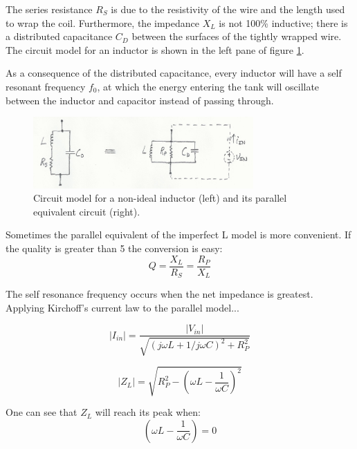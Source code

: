 \documentclass[titlepage, letterpaper, 11pt]{article}
\begin{document}
The series resistance $R_{S}$ is due to the resistivity of the
wire and the length used to wrap the coil. Furthermore, the
impedance $X_{L}$ is not 100\% inductive; there is a distributed
capacitance $C_{D}$ between the surfaces of the tightly wrapped
wire. The circuit model for an inductor is shown in the left pane of
figure \ref{tankCircuit}.

As a consequence of the distributed capacitance, every inductor
will have a self resonant frequency $f_{0}$, at which the energy
entering the tank will oscillate between the inductor and capacitor
instead of passing through.

\begin{figure}[ht]
	\centering
	\includegraphics[width=0.75\textwidth]
		{figures/tankCircuit.png}
	\caption{
		Circuit model for a non-ideal inductor (left) and its
		parallel equivalent circuit (right).
	}
	\label{tankCircuit}
\end{figure}

Sometimes the parallel equivalent of the imperfect L model is more
convenient. If the quality is greater than 5 the conversion is easy:
\begin{equation}
Q=\frac{X_{L}}{R_{S}}=\frac{R_{P}}{X_{L}}
\end{equation}

The self resonance frequency occurs when the net impedance is
greatest. Applying Kirchoff's current law to the parallel model...

\begin{equation*}
|I_{in}|=\frac{|V_{in}|}
{\sqrt{(j\omega L+1/j\omega C)^{2}+R_{P}^{2}}}
\end{equation*}

\begin{equation}
|Z_{L}|=\sqrt{R_{P}^{2}-\left(\omega L-\frac{1}{\omega C}\right)^{2}}
\end{equation}

One can see that $Z_{L}$ will reach its peak when:
\begin{equation*}
\left(\omega L-\frac{1}{\omega C}\right)=0
\label{resonantFrequencyEq}
\end{equation*}
\end{document}
